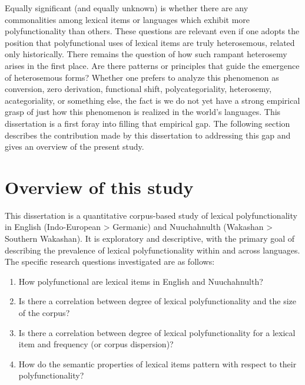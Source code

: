 \noindent Equally significant (and equally unknown) is whether there are any commonalities among lexical items or languages which exhibit more polyfunctionality than others. These questions are relevant even if one adopts the position that polyfunctional uses of lexical items are truly heterosemous, related only historically. There remains the question of how such rampant heterosemy arises in the first place. Are there patterns or principles that guide the emergence of heterosemous forms? Whether one prefers to analyze this phenomenon as conversion, zero derivation, functional shift, polycategoriality, heterosemy, acategoriality, or something else, the fact is we do not yet have a strong empirical grasp of just how this phenomenon is realized in the world's languages. This dissertation is a first foray into filling that empirical gap. The following section describes the contribution made by this dissertation to addressing this gap and gives an overview of the present study.

\section{Overview of this study}
\label{sec:1.3}

This dissertation is a quantitative corpus-based study of lexical polyfunctionality in English (Indo-European > Germanic) and Nuuchahnulth (Wakashan > Southern Wakashan). It is exploratory and descriptive, with the primary goal of describing the prevalence of lexical polyfunctionality within and across languages. The specific research questions investigated are as follows:

\clearpage

\begin{enumerate}[
  label      = {\textbf{R\arabic*:}},
  leftmargin = *,
  ref        = {R\arabic*}
]
  \item\label{R1} How polyfunctional are lexical items in English and Nuuchahnulth?
  \item\label{R2} Is there a correlation between degree of lexical polyfunctionality and the size of the corpus?
  \item\label{R3} Is there a correlation between degree of lexical polyfunctionality for a lexical item and frequency (or corpus dispersion)?
  \item\label{R4} How do the semantic properties of lexical items pattern with respect to their polyfunctionality?
\end{enumerate}

